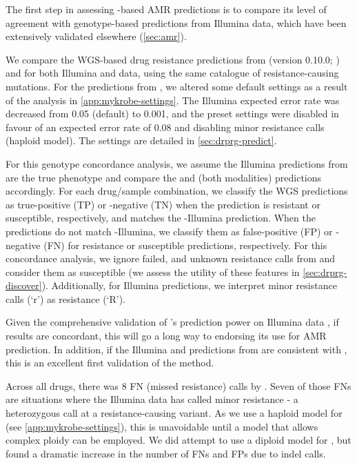 The first step in assessing \ont{}-based AMR predictions is to compare its level of agreement with genotype-based predictions from Illumina data, which have been extensively validated elsewhere (\autoref{sec:amr}).

We compare the WGS-based drug resistance predictions from \mykrobe{} (version 0.10.0; \cite{hunt2019}) and \drprg{} for both Illumina and \ont{} data, using the same catalogue of resistance-causing mutations. For the predictions from \mykrobe{}, we altered some default settings as a result of the analysis in \autoref{app:mykrobe-settings}. The Illumina expected error rate was decreased from 0.05 (default) to 0.001, and the preset \ont{} settings were disabled in favour of an expected error rate of 0.08 and disabling minor resistance calls (haploid model). The \drprg{} settings are detailed in \autoref{sec:drprg-predict}. 

For this genotype concordance analysis, we assume the Illumina predictions from \mykrobe{} are the true phenotype and compare the \mykrobe{} \ont{} and \drprg{} (both modalities) predictions accordingly. For each drug/sample combination, we classify the WGS predictions as true-positive (TP) or -negative (TN) when the prediction is resistant or susceptible, respectively, and matches the \mykrobe{}-Illumina prediction. When the predictions do not match \mykrobe{}-Illumina, we classify them as false-positive (FP) or -negative (FN) for resistance or susceptible predictions, respectively. For this concordance analysis, we ignore failed, and unknown resistance calls from \drprg{} and consider them as susceptible (we assess the utility of these features in \autoref{sec:drprg-discover}). Additionally, for \mykrobe{} Illumina predictions, we interpret minor resistance calls (`r') as resistance (`R').

Given the comprehensive validation of \mykrobe{}'s prediction power on Illumina data \cite{hunt2019,bradley2015}, if \ont{} results are concordant, this will go a long way to endorsing its use for AMR prediction. In addition, if the Illumina and \ont{} predictions from \drprg{} are consistent with \mykrobe{}, this is an excellent first validation of the method.

Across all drugs, there was 8 FN (missed resistance) calls by \mykrobe{} \ont{}. Seven of those FNs are situations where the Illumina data has called minor resistance - a heterozygous call at a resistance-causing variant. As we use a haploid model for \ont{} (see \autoref{app:mykrobe-settings}), this is unavoidable until a model that allows complex ploidy can be employed. We did attempt to use a diploid model for \ont{}, but found a dramatic increase in the number of FNs and FPs due to indel calls.

